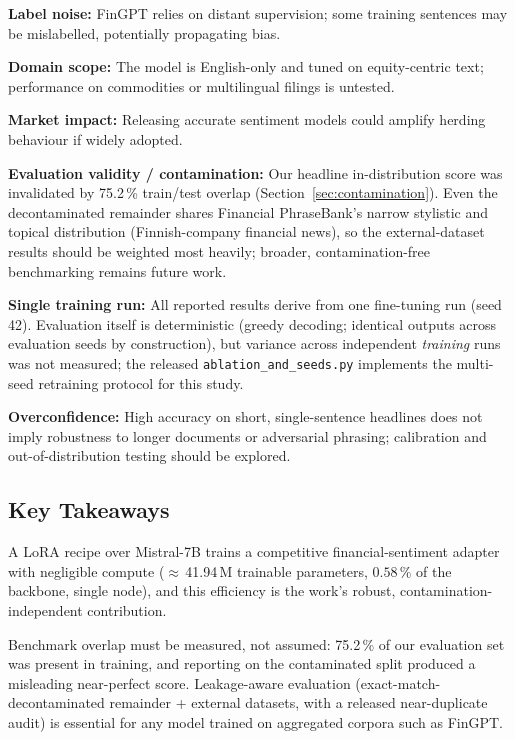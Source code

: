 \documentclass[a4paper]{article}
\begin{document}
\textbf{Label noise:} FinGPT relies on distant supervision; some training sentences may be mislabelled, potentially propagating bias.

\textbf{Domain scope:} The model is English-only and tuned on equity-centric text; performance on commodities or multilingual filings is untested.

\textbf{Market impact:} Releasing accurate sentiment models could amplify herding behaviour if widely adopted.

\textbf{Evaluation validity / contamination:} Our headline in-distribution score was invalidated by 75.2\,\% train/test overlap (Section~\ref{sec:contamination}). Even the decontaminated remainder shares Financial PhraseBank's narrow stylistic and topical distribution (Finnish-company financial news), so the external-dataset results should be weighted most heavily; broader, contamination-free benchmarking remains future work.

\textbf{Single training run:} All reported results derive from one fine-tuning run (seed 42). Evaluation itself is deterministic (greedy decoding; identical outputs across evaluation seeds by construction), but variance across independent \emph{training} runs was not measured; the released \texttt{ablation\_and\_seeds.py} implements the multi-seed retraining protocol for this study.

\textbf{Overconfidence:} High accuracy on short, single-sentence headlines does not imply robustness to longer documents or adversarial phrasing; calibration and out-of-distribution testing should be explored.

\subsection{Key Takeaways}

A LoRA recipe over Mistral-7B trains a competitive financial-sentiment adapter with negligible compute ($\approx$\,41.94\,M trainable parameters, $0.58\,\%$ of the backbone, single node), and this efficiency is the work's robust, contamination-independent contribution.

Benchmark overlap must be measured, not assumed: 75.2\,\% of our evaluation set was present in training, and reporting on the contaminated split produced a misleading near-perfect score. Leakage-aware evaluation (exact-match-decontaminated remainder + external datasets, with a released near-duplicate audit) is essential for any model trained on aggregated corpora such as FinGPT.
\end{document}
